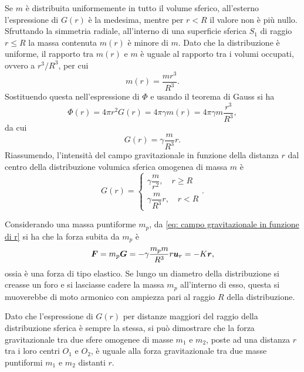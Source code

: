 Se $m$ è distribuita uniformemente in tutto il volume sferico, all'esterno l'espressione di $G(r)$ è la medesima, mentre per $r<R$ il valore non è più nullo. Sfruttando la simmetria radiale, all'interno di una superficie sferica $S_1$ di raggio $r\le R$ la massa contenuta $m(r)$ è minore di $m$. Dato che la distribuzione è uniforme, il rapporto tra $m(r)$ e $m$ è uguale al rapporto tra i volumi occupati, ovvero a $r^3/R^3$, per cui
\begin{equation}
    m(r)=\frac{mr^3}{R^3}.
\end{equation}
Sostituendo questa nell'espressione di $\Phi$ e usando il teorema di Gauss si ha
\begin{equation}
    \Phi(r)=4\pi r^2G(r)=4\pi\gamma m(r)=4\pi\gamma m\frac{r^3}{R^3},
\end{equation}
da cui
\begin{equation}
    G(r)=\gamma\frac{m}{R^3}r.
\end{equation}
Riassumendo, l'intensità del campo gravitazionale in funzione della distanza $r$ dal centro della distribuzione volumica sferica omogenea di massa $m$ è
\begin{equation}
\label{eq: campo gravitazionale in funzione di r}
    G(r)=\begin{cases}
        \gamma\dfrac{m}{r^2},\quad r\ge R\\[1.5ex]
        \gamma\dfrac{m}{R^3}r,\quad r<R
    \end{cases}.
\end{equation}
\begin{obs}
    Considerando una massa puntiforme $m_p$, da \eqref{eq: campo gravitazionale in funzione di r} si ha che la forza subita da $m_p$ è
    \begin{equation}
        \bm{F}=m_p\bm{G}=-\gamma\frac{m_pm}{R^3}r\bm{u}_r=-K\bm{r},
    \end{equation}
    ossia è una forza di tipo elastico. Se lungo un diametro della distribuzione si creasse un foro e si lasciasse cadere la massa $m_p$ all'interno di esso, questa si muoverebbe di moto armonico con ampiezza pari al raggio $R$ della distribuzione. 
\end{obs}
Dato che l'espressione di $G(r)$ per distanze maggiori del raggio della distribuzione sferica è sempre la stessa, si può dimostrare che la forza gravitazionale tra due sfere omogenee di masse $m_1$ e $m_2$, poste ad una distanza $r$ tra i loro centri $O_1$ e $O_2$, è uguale alla forza gravitazionale tra due masse puntiformi $m_1$ e $m_2$ distanti $r$.

